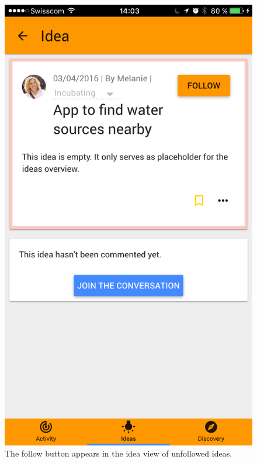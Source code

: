 \documentclass[a4paper,12pt,twoside]{article}
\begin{document}
\begin{figure}[!htb]
\begin{minipage}[t]{.48\textwidth}
        \includegraphics[width=.67\textwidth]{images/flow_follow_2.png}
        \caption{The follow button appears in the idea view of unfollowed ideas.}
    \end{minipage}
\end{figure}
\end{document}

